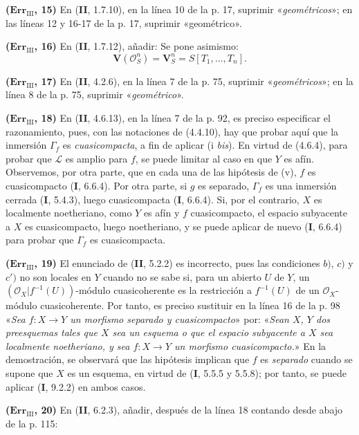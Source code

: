 \noindent\textbf{($\mathbf{Err}_{\mathrm{III}}$, 15)} En (\textbf{II}, 1.7.10), en
la línea 10 de la p. 17, suprimir «\emph{geométricos}»; en las líneas 12 y
16-17 de la p. 17, suprimir «geométrico».

\noindent\textbf{($\mathbf{Err}_{\mathrm{III}}$, 16)} En (\textbf{II}, 1.7.12),
añadir: Se pone asimismo:
\[
  \mathbf V(\mathscr O_S^n)=\mathbf V_S^n=S[T_1,\ldots,T_n].
\]

\noindent\textbf{($\mathbf{Err}_{\mathrm{III}}$, 17)} En (\textbf{II}, 4.2.6), en la
línea 7 de la p. 75, suprimir «\emph{geométricos}»; en la línea 8 de la p. 75,
suprimir «\emph{geométrico}».

\noindent\textbf{($\mathbf{Err}_{\mathrm{III}}$, 18)} En (\textbf{II}, 4.6.13), en la
línea 7 de la p. 92, es preciso especificar el razonamiento, pues, con las
notaciones de (4.4.10), hay que probar aquí que la inmersión $\Gamma_f$ es
\emph{cuasicompacta}, a fin de aplicar (i \emph{bis}). En virtud de (4.6.4), para
probar que $\mathscr L$ es amplio para $f$, se puede limitar al caso
en que $Y$ es afín. Observemos, por otra parte, que en cada una de las hipótesis
de (v), $f$ es cuasicompacto (\textbf I, 6.6.4). Por otra parte, si $g$ es
separado, $\Gamma_f$ es una inmersión cerrada (\textbf I, 5.4.3), luego cuasicompacta
(\textbf I, 6.6.4). Si, por el contrario, $X$ es localmente noetheriano, como $Y$ es
afín y $f$ cuasicompacto, el espacio subyacente a $X$ es cuasicompacto, luego
noetheriano, y se puede aplicar de nuevo (\textbf I, 6.6.4) para probar que $\Gamma_f$
es cuasicompacta.

\noindent\textbf{($\mathbf{Err}_{\mathrm{III}}$, 19)} El enunciado de (\textbf{II},
5.2.2) es incorrecto, pues las condiciones $b)$, $c)$ y $c')$ no son locales
en $Y$ cuando no se sabe si, para un abierto $U$ de $Y$, un
$(\mathscr O_X|f^{-1}(U))$-módulo cuasicoherente es la restricción a
$f^{-1}(U)$ de un $\mathscr O_X$-módulo cuasicoherente. Por tanto, es preciso
sustituir en la línea 16 de la p. 98 «\emph{Sea $f:X\to Y$ un morfismo separado
y cuasicompacto}» por: «\emph{Sean $X$, $Y$ dos preesquemas tales que $X$ sea
un esquema o que el espacio subyacente a $X$ sea localmente noetheriano, y sea
$f:X\to Y$ un morfismo cuasicompacto.}» En la demostración, se observará que
las hipótesis implican que $f$ es \emph{separado} cuando se supone que $X$ es
un esquema, en virtud de (\textbf I, 5.5.5 y 5.5.8); por tanto, se puede aplicar
(\textbf I, 9.2.2) en ambos casos.

\noindent\textbf{($\mathbf{Err}_{\mathrm{III}}$, 20)} En (\textbf{II}, 6.2.3),
añadir, después de la línea 18 contando desde abajo de la p. 115:

